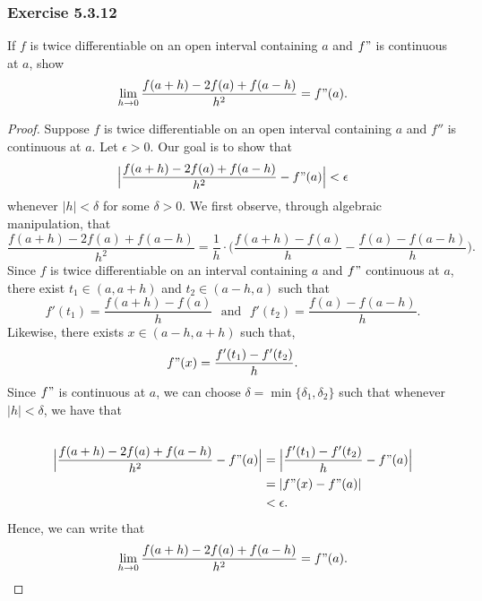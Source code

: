 \subsubsection{Exercise 5.3.12} If \( f  \) is twice differentiable on an open interval containing \( a  \) and \( f" \) is continuous at \( a  \), show 
\[  \lim_{ h \to 0 }  \frac{ f(a+h) - 2f(a) + f(a-h)  }{ h^2  } = f"(a). \]
\begin{proof}
Suppose \( f  \) is twice differentiable on an open interval containing \( a  \) and \( f''  \) is continuous at \( a  \). Let \( \epsilon > 0  \). Our goal is to show that 
\[  \Big| \frac{ f(a+h) - 2 f(a) + f(a-h)  }{ h^2  } - f"(a) \Big| < \epsilon \]
whenever \( | h  | < \delta  \) for some \( \delta > 0  \). We first observe, through algebraic manipulation, that 
\[ \frac{ f(a+h) - 2f(a) + f(a-h)  }{ h^2  } = \frac{ 1 }{ h } \cdot  \Big( \frac{ f(a+h) - f(a)  }{ h } - \frac{  f(a) - f(a-h)  }{ h } \Big). \tag{1} \]
Since \( f \) is twice differentiable on an interval containing \(  a \) and \( f" \) continuous at \( a \), there exist \( t_1 \in (a, a+h)  \) and \( t_2 \in (a-h, a)  \) such that 
\[ f'(t_1) = \frac{ f(a+h) - f(a)  }{ h } \text{~ and ~} f'(t_2) = \frac{ f(a) - f(a-h)  }{ h }.  \]
Likewise, there exists \( x \in (a-h, a+h)  \) such that, 
\[  f"(x) = \frac{ f'(t_1) - f'(t_2)   }{ h }. \] Since \( f" \) is continuous at \( a  \), we can choose \( \delta = \min \{ \delta_1, \delta_2  \}  \) such that whenever \( | h  |  < \delta  \), we have that 
\begin{align*}
    & \\
    \Big| \frac{ f(a+h) - 2 f(a) + f(a-h)  }{ h^2  } - f"(a) \Big| &= \Big| \frac{ f'(t_1) - f'(t_2)  }{ h } - f"(a)  \Big| \\  
                                                                   &= | f"(x) - f"(a)  | \\
                                                                   &< \epsilon.
\end{align*}
Hence, we can write that 
\[  \lim_{ h \to 0 }  \frac{ f(a+h) - 2f(a) + f(a-h)  }{ h^2  } = f"(a). \]
\end{proof}






